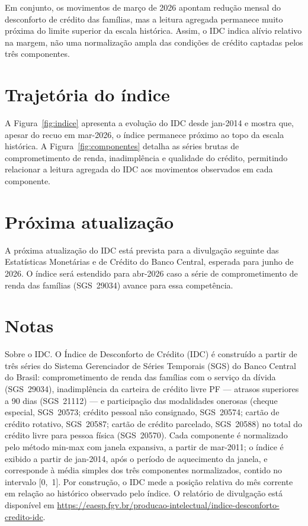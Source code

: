 \documentclass[11pt,a4paper]{article}
\newcommand{\proxdivulgacao}{junho de 2026}              %
\newcommand{\mesproximo}{abr-2026}                    %
\newcommand{\janelainicio}{jan-2014}   %
\newcommand{\seriesinicio}{mar-2011}   %
\begin{document}
Em conjunto, os movimentos de março de 2026 apontam redução mensal do desconforto de crédito das famílias, mas a leitura agregada permanece muito próxima do limite superior da escala histórica. Assim, o IDC indica alívio relativo na margem, não uma normalização ampla das condições de crédito captadas pelos três componentes.

\section{Trajetória do índice}

A Figura~\ref{fig:indice} apresenta a evolução do IDC desde jan-2014 e mostra que,
apesar do recuo em mar-2026, o índice permanece próximo ao topo da escala histórica.
A Figura~\ref{fig:componentes} detalha as séries brutas de comprometimento de renda,
inadimplência e qualidade do crédito, permitindo relacionar a leitura agregada do IDC aos
movimentos observados em cada componente.

\section{Próxima atualização}

A próxima atualização do IDC está prevista para a divulgação seguinte das Estatísticas
Monetárias e de Crédito do Banco Central, esperada para \proxdivulgacao.
O índice será estendido para \mesproximo{} caso a série de comprometimento de renda das
famílias (SGS~29034) avance para essa competência.

\section*{Notas}

\begingroup\footnotesize

Sobre o IDC. O Índice de Desconforto de Crédito (IDC) é construído a partir de
três séries do Sistema Gerenciador de Séries Temporais (SGS) do Banco Central do Brasil:
comprometimento de renda das famílias com o serviço da dívida (SGS~29034), inadimplência
da carteira de crédito livre PF --- atrasos superiores a 90 dias (SGS~21112) --- e
participação das modalidades onerosas (cheque especial, SGS~20573; crédito pessoal não
consignado, SGS~20574; cartão de crédito rotativo, SGS~20587; cartão de crédito parcelado,
SGS~20588) no total do crédito livre para pessoa física (SGS~20570). Cada componente é
normalizado pelo método min-max com janela expansiva, a partir de \seriesinicio; o índice
é exibido a partir de \janelainicio, após o período de aquecimento da janela, e corresponde
à média simples dos três componentes normalizados, contido no intervalo [0,~1]. Por
construção, o IDC mede a posição relativa do mês corrente em relação ao histórico observado
pelo índice. O relatório de divulgação está disponível em
\url{https://eaesp.fgv.br/producao-intelectual/indice-desconforto-credito-idc}.
\end{document}

